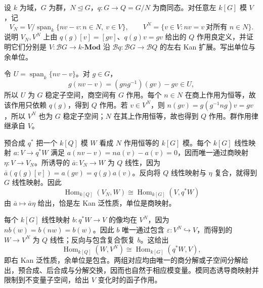 \begin{optionalexercise}\label{b4:ex:03-kan-invariants-coinvariants}
	设 \(k\) 为域，\(G\) 为群，\(N\trianglelefteq G\)，\(q:G\rightarrow Q=G/N\) 为商同态。对任意左 \(k[G]\) 模 \(V\)，记
	\[
		V_N=V/\operatorname{span}_k\{nv-v:n\in N,\ v\in V\},
		\qquad
		V^N=\{v\in V:nv=v\ \text{对所有 }n\in N\}.
	\]
	说明 \(V_N,V^N\) 上由 \(q(g)[v]=[gv]\)、\(q(g)v=gv\) 给出的 \(Q\) 作用良定义，并证明它们分别是 \(V:\mathcal BG\rightarrow k\text{-}\mathbf{Mod}\) 沿 \(\mathcal Bq:\mathcal BG\rightarrow\mathcal BQ\) 的左右 Kan 扩展。写出单位与余单位。
\end{optionalexercise}
\begin{solution}
	令 \(U=\operatorname{span}_k\{nv-v\}\)。对 \(g\in G\)，
	\[
		g(nv-v)=(gng^{-1})(gv)-gv\in U,
	\]
	所以 \(U\) 为 \(G\) 稳定子空间，商空间有 \(G\) 作用。每个 \(n\in N\) 在商上作用为恒等，故该作用只依赖 \(q(g)\)，得到 \(Q\) 作用。若 \(v\in V^N\)，则
	\(n(gv)=g(g^{-1}ng)v=gv\)，所以 \(V^N\) 也为 \(G\) 稳定子空间；\(N\) 在其上作用恒等，故也得到 \(Q\) 作用。群作用律继承自 \(V\)。

	预合成 \(q^*\) 把一个 \(k[Q]\) 模 \(W\) 看成 \(N\) 作用恒等的 \(k[G]\) 模。每个 \(k[G]\) 线性映射 \(a:V\rightarrow q^*W\) 满足 \(a(nv-v)=na(v)-a(v)=0\)，因而唯一通过商映射 \(\eta:V\rightarrow V_N\)。所诱导的 \(\bar a:V_N\rightarrow W\) 为 \(Q\) 线性，因为
	\(\bar a(q(g)[v])=a(gv)=q(g)a(v)\)。反向将 \(Q\) 线性映射与 \(\eta\) 复合，就得到 \(G\) 线性映射。因此
	\[
		\operatorname{Hom}_{k[Q]}(V_N,W)
		\cong\operatorname{Hom}_{k[G]}(V,q^*W)
	\]
	由 \(\bar a\mapsto\bar a\eta\) 给出，恰是左 Kan 泛性质，单位是商映射。

	每个 \(k[G]\) 线性映射 \(b:q^*W\rightarrow V\) 的像均在 \(V^N\)，因为 \(nb(w)=b(nw)=b(w)\)。因此 \(b\) 唯一通过包含 \(\varepsilon:V^N\hookrightarrow V\)，而得到的 \(W\rightarrow V^N\) 为 \(Q\) 线性；反向与包含复合恢复 \(b\)。这给出
	\[
		\operatorname{Hom}_{k[Q]}(W,V^N)
		\cong\operatorname{Hom}_{k[G]}(q^*W,V),
	\]
	即右 Kan 泛性质，余单位是包含。两组对应均由唯一的商分解或子空间分解给出，预合成、后合成与分解交换，因而也自然于相应模变量。模同态诱导商映射并限制到不变量子空间，给出 \(V\) 变化时的函子作用。
\end{solution}

